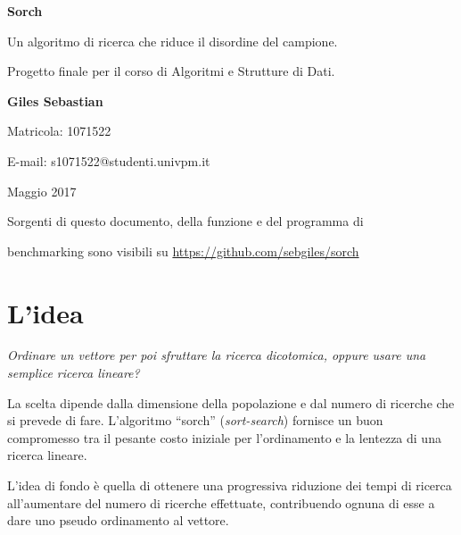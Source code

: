 \documentclass{article}
\begin{document}
\thispagestyle{plain}
\vspace*{\fill}
\begin{center}

    \begin{Huge}
    \textbf{Sorch}
    \end{Huge}
    \vspace{1cm}

    Un algoritmo di ricerca che riduce il disordine del campione.
    \vspace{1cm}

    Progetto finale per il corso di Algoritmi e Strutture di Dati.
    \vspace{1cm}

    \begin{Large}
    \textbf{Giles Sebastian}
    \end{Large}
    \vspace{1cm}

    Matricola: 1071522
    \vspace{0.4cm}

    E-mail: s1071522@studenti.univpm.it
    \vspace{0.4cm}

    Maggio 2017
    \vspace{5cm}

    Sorgenti di questo documento, della funzione e del programma di

    benchmarking sono visibili su
    \url{https://github.com/sebgiles/sorch}



\end{center}
\vspace*{\fill}

\newpage
{}
\section{L'idea}

    \textit{Ordinare un vettore per poi sfruttare la ricerca dicotomica,
    oppure usare una semplice ricerca lineare?}

    La scelta dipende dalla dimensione della popolazione e dal numero
    di ricerche che si prevede di fare.
    L'algoritmo “sorch” (\textit{sort-search}) fornisce un buon compromesso tra
    il pesante costo iniziale per l'ordinamento e la lentezza di una ricerca
    lineare.

    L'idea di fondo è quella di ottenere una progressiva riduzione dei tempi
    di ricerca all'aumentare del numero di ricerche effettuate, contribuendo
    ognuna di esse a dare uno pseudo ordinamento al vettore.
\end{document}
